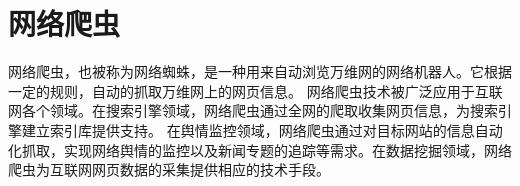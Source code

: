 \documentclass[master]{njuthesis}
\begin{document}


\section{网络爬虫}\label{section_crawler}
网络爬虫，也被称为网络蜘蛛，是一种用来自动浏览万维网的网络机器人\cite{siddesh2017optimizing}。它根据一定的规则，自动的抓取万维网上的网页信息。
网络爬虫技术被广泛应用于互联网各个领域。在搜索引擎领域，网络爬虫通过全网的爬取收集网页信息，为搜索引擎建立索引库提供支持。
在舆情监控领域，网络爬虫通过对目标网站的信息自动化抓取，实现网络舆情的监控以及新闻专题的追踪等需求\cite{crawler4j}。在数据挖掘领域，网络
爬虫为互联网网页数据的采集提供相应的技术手段\cite{stormCrawler}。
\end{document}
